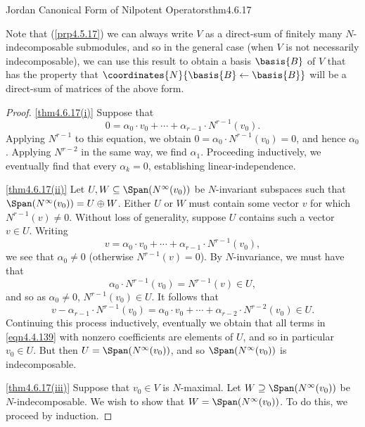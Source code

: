\begin{thm}{Jordan Canonical Form of Nilpotent Operators}{thm4.6.17}
\begin{rmk}
	\end{rmk}
	\begin{rmk}
		Note that (\cref{prp4.5.17}) we can always write $V$ as a direct-sum of finitely many $N$-indecomposable submodules, and so in the general case (when $V$ is not necessarily indecomposable), we can use this result to obtain a basis $\basis{B}$ of $V$ that has the property that $\coordinates{N}{\basis{B}\leftarrow \basis{B}}$ will be a direct-sum of matrices of the above form.
	\end{rmk}
	\begin{proof}
		\cref{thm4.6.17(i)} Suppose that
		\begin{equation}
		0=\alpha _0\cdot v_0+\cdots +\alpha _{r-1}\cdot N^{r-1}(v_0).
		\end{equation}
		Applying $N^{r-1}$ to this equation, we obtain $0=\alpha _0\cdot N^{r-1}(v_0)=0$, and hence $\alpha _0$.  Applying $N^{r-2}$ in the same way, we find $\alpha _1$.  Proceeding inductively, we eventually find that every $\alpha _k=0$, establishing linear-independence.
		
		\blni
		\cref{thm4.6.17(ii)} Let $U,W\subseteq \Span (N^{\infty}(v_0))$ be $N$-invariant subspaces such that $\Span (N^{\infty}(v_0))=U\oplus W$.  Either $U$ or $W$ must contain some vector $v$ for which $N^{r-1}(v)\neq 0$.  Without loss of generality, suppose $U$ contains such a vector $v\in U$.  Writing
		\begin{equation}\label{eqn4.4.139}
			v=\alpha _0\cdot v_0+\cdots +\alpha _{r-1}\cdot N^{r-1}(v_0),
		\end{equation}
		we see that $\alpha _0\neq 0$ (otherwise $N^{r-1}(v)=0$).  By $N$-invariance, we must have that
		\begin{equation}
			\alpha _0\cdot N^{r-1}(v_0)=N^{r-1}(v)\in U,
		\end{equation}
		and so as $\alpha _0\neq 0$, $N^{r-1}(v_0)\in U$.  It follows that
		\begin{equation}
			v-\alpha _{r-1}\cdot N^{r-1}(v_0)=\alpha _0\cdot v_0+\cdots +\alpha _{r-2}\cdot N^{r-2}(v_0)\in U.
		\end{equation}
		Continuing this process inductively, eventually we obtain that all terms in \eqref{eqn4.4.139} with nonzero coefficients are elements of $U$, and so in particular $v_0\in U$.  But then $U=\Span (N^{\infty}(v_0))$, and so $\Span (N^{\infty}(v_0))$ is indecomposable.
		
		
		\blni
		\cref{thm4.6.17(iii)} Suppose that $v_0\in V$ is $N$-maximal.  Let $W\supseteq \Span (N^{\infty}(v_0))$ be $N$-indecomposable.  We wish to show that $W=\Span (N^{\infty}(v_0))$.  To do this, we proceed by induction.
		

\end{proof}
\end{thm}
